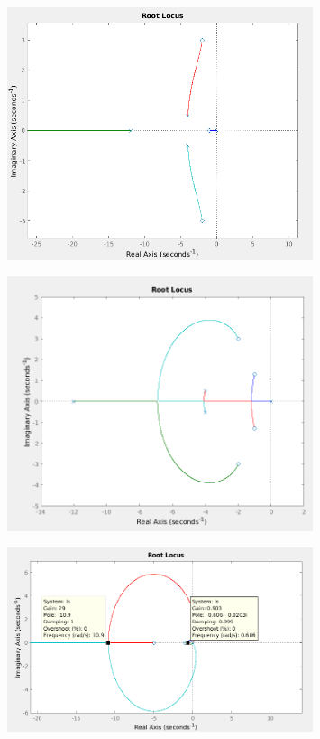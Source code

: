
\begin{figure}[H]
\centering
\includegraphics[width=0.8\textwidth]{tarea3/matlabimg/ej2_p4.png}
\end{figure}

\begin{figure}[H]
\centering
\includegraphics[width=0.8\textwidth]{tarea3/matlabimg/ej2_p5.png}
\end{figure}

\begin{figure}[H]
\centering
\includegraphics[width=0.8\textwidth]{tarea3/matlabimg/ej2_p6.png}
\end{figure}
